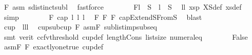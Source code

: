 \begin{isabellebody}
\ F{}{}\ asm{\isacharparenleft}{\kern0pt}{}{\isacharparenright}{\kern0pt}\ sdistinct{\isacharunderscore}{\kern0pt}subl\ \isamarkupfalse%
\ fastforce\isanewline
\ \ \ \ \ \ \isamarkupfalse%
\ F{}{\isacharcolon}{\kern0pt}{\isachardoublequoteopen}l{}\ {\isasymin}\ S{}\ {\isasymand}\ l{}\ {\isasymin}\ S{}{\isachardoublequoteclose}\ \isamarkupfalse%
\ l{}l{}\ xs{}p{}\ XS{}{\isacharunderscore}{\kern0pt}def\ xs{}{\isacharunderscore}{\kern0pt}def\ \isamarkupfalse%
\ simp\isanewline
\ \ \ \ \ \ \isamarkupfalse%
\ F{}{}{\isacharcolon}{\kern0pt}\ {\isachardoublequoteopen}cap{}\ l{}\ l{}\ l{}{\isachardoublequoteclose}\ \isamarkupfalse%
\ F{}{}\ F{}\ F{}\ capExtendS{}FromS{}\ \isamarkupfalse%
\ blast\isanewline
\isanewline
\ \ \ \ \ \ \isamarkupfalse%
\ {\isachardoublequoteopen}cup\ {}\ {\isacharbrackleft}{\kern0pt}l{}{\isacharcomma}{\kern0pt}l{}{\isacharcomma}{\kern0pt}l{}{\isacharbrackright}{\kern0pt}{\isachardoublequoteclose}\ \isamarkupfalse%
\ cup{\isacharunderscore}{\kern0pt}sub{\isacharunderscore}{\kern0pt}cup\ F{}{}\ asmF\ sublist{\isacharunderscore}{\kern0pt}imp{\isacharunderscore}{\kern0pt}subseq\isanewline
\ \ \ \ \ \ \ \ \isamarkupfalse%
\ {\isacharparenleft}{\kern0pt}smt\ {\isacharparenleft}{\kern0pt}verit{\isacharcomma}{\kern0pt}\ ccfv{\isacharunderscore}{\kern0pt}threshold{\isacharparenright}{\kern0pt}\ cup{\isacharunderscore}{\kern0pt}def\ length{\isacharunderscore}{\kern0pt}Cons\ list{\isachardot}{\kern0pt}size{\isacharparenleft}{\kern0pt}{}{\isacharparenright}{\kern0pt}\ numeral{\isacharunderscore}{\kern0pt}{}{\isacharunderscore}{\kern0pt}eq{\isacharunderscore}{\kern0pt}{}{\isacharparenright}{\kern0pt}\isanewline
\isanewline
\ \ \ \ \ \ \isamarkupfalse%
\ False\ \isamarkupfalse%
\ asmF{\isacharparenleft}{\kern0pt}{}{\isacharparenright}{\kern0pt}\ F{}{}\ exactly{\isacharunderscore}{\kern0pt}one{\isacharunderscore}{\kern0pt}true\ cup{\isacharunderscore}{\kern0pt}def\isanewline

\end{isabellebody}
